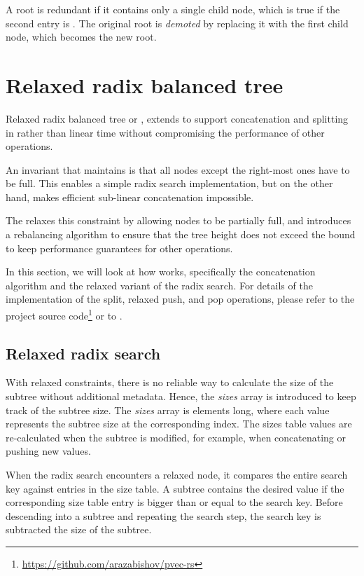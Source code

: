 A root is redundant if it contains only a single child node, which is true if the second entry is \nil{}.  The original root is \emph{demoted} by replacing it with the first child node, which becomes the new root.

\section{Relaxed radix balanced tree}
Relaxed radix balanced tree or \treerrb{}, extends \treerb{} to support concatenation and splitting in  rather than linear time without compromising the performance of other operations.

An invariant that \treerb{} maintains is that all nodes except the right-most ones have to be full. This enables a simple radix search implementation, but on the other hand, makes efficient sub-linear concatenation impossible.

The \treerrb{} relaxes this constraint by allowing nodes to be partially full, and introduces a rebalancing algorithm to ensure that the tree height does not exceed the  bound to keep performance guarantees for other operations.

In this section, we will look at how \treerrb{} works, specifically the concatenation algorithm and the relaxed variant of the radix search. For details of the implementation of the split, relaxed push, and pop operations, please refer to the project source code\footnote{\url{https://github.com/arazabishov/pvec-rs}} or to \cite{improving-performance-through-transience}.

\subsection{Relaxed radix search}
With relaxed \treerrb{} constraints, there is no reliable way to calculate the size of the subtree without additional metadata. Hence, the \emph{sizes} array is introduced to keep track of the subtree size. The \emph{sizes} array is \m{} elements long, where each value represents the subtree size at the corresponding index. The sizes table values are re-calculated when the subtree is modified, for example, when concatenating or pushing new values.

When the radix search encounters a relaxed node, it compares the entire search key against entries in the size table. A subtree contains the desired value if the corresponding size table entry is bigger than or equal to the search key. Before descending into a subtree and repeating the search step, the search key is subtracted the size of the subtree.

